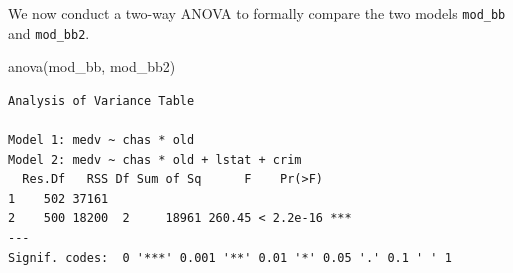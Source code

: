 \documentclass[
  12pt,
  letterpaper,
]{scrbook}
\newenvironment{Shaded}{\begin{snugshade}}{\end{snugshade}}
\newcommand{\FunctionTok}[1]{\textcolor[rgb]{0.28,0.35,0.67}{#1}}
\newcommand{\NormalTok}[1]{\textcolor[rgb]{0.00,0.23,0.31}{#1}}
\theoremstyle{definition}
\theoremstyle{plain}
\theoremstyle{remark}
\begin{document}
We now conduct a two-way ANOVA to formally compare the two models
\texttt{mod\_bb} and \texttt{mod\_bb2}.

\begin{Shaded}
\begin{Highlighting}[]
\FunctionTok{anova}\NormalTok{(mod\_bb, mod\_bb2)}
\end{Highlighting}
\end{Shaded}

\begin{verbatim}
Analysis of Variance Table

Model 1: medv ~ chas * old
Model 2: medv ~ chas * old + lstat + crim
  Res.Df   RSS Df Sum of Sq      F    Pr(>F)    
1    502 37161                                  
2    500 18200  2     18961 260.45 < 2.2e-16 ***
---
Signif. codes:  0 '***' 0.001 '**' 0.01 '*' 0.05 '.' 0.1 ' ' 1
\end{verbatim}
\end{document}
